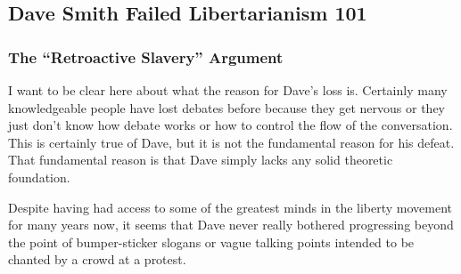\documentclass[11pt]{article}
\begin{document}
\subsection{Dave Smith Failed Libertarianism 101}
\label{sec:org78add42}
\subsubsection{The ``Retroactive Slavery'' Argument}
\label{sec:org59cfe47}
I want to be clear here about what the reason for Dave's loss is. Certainly many knowledgeable people have lost debates before because they get nervous or they just don't know how debate works or how to control the flow of the conversation. This is certainly true of Dave, but it is not the fundamental reason for his defeat. That fundamental reason is that Dave simply lacks any solid theoretic foundation.

Despite having had access to some of the greatest minds in the liberty movement for many years now, it seems that Dave never really bothered progressing beyond the point of bumper-sticker slogans or vague talking points intended to be chanted by a crowd at a protest.
\end{document}
